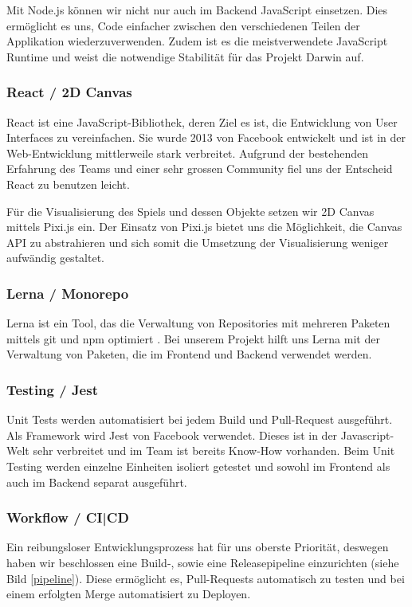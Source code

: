 \documentclass[11pt,a4paper,titlepage]{article}
\begin{document}
Mit Node.js können wir nicht nur auch im Backend JavaScript einsetzen. Dies ermöglicht es uns, Code einfacher zwischen den verschiedenen Teilen der Applikation wiederzuverwenden. Zudem ist es die meistverwendete JavaScript Runtime \cite{node.js} und weist die notwendige Stabilität für das Projekt Darwin auf.

\subsubsection{React / 2D Canvas}
React ist eine JavaScript-Bibliothek, deren Ziel es ist, die Entwicklung von User Interfaces zu vereinfachen. Sie wurde 2013 von Facebook entwickelt und ist in der Web-Entwicklung mittlerweile stark verbreitet.
Aufgrund der bestehenden Erfahrung des Teams und einer sehr grossen Community fiel uns der Entscheid React zu benutzen leicht.

Für die Visualisierung des Spiels und dessen Objekte setzen wir 2D Canvas mittels Pixi.js ein. Der Einsatz von Pixi.js bietet uns die Möglichkeit, die Canvas API zu abstrahieren und sich somit die Umsetzung der Visualisierung weniger aufwändig gestaltet.

\subsubsection{Lerna / Monorepo}
Lerna ist ein Tool, das die Verwaltung von Repositories mit mehreren Paketen mittels git und npm optimiert \cite{lerna}. Bei unserem Projekt hilft uns Lerna mit der Verwaltung von Paketen, die im Frontend und Backend verwendet werden.

\subsubsection{Testing / Jest}
Unit Tests werden automatisiert bei jedem Build und Pull-Request ausgeführt.
Als Framework wird Jest von Facebook verwendet. Dieses ist in der Javascript-Welt sehr verbreitet und im Team ist bereits Know-How vorhanden.
Beim Unit Testing werden einzelne Einheiten isoliert getestet und sowohl im Frontend als auch im Backend separat ausgeführt.

\subsubsection{Workflow / CI|CD}
Ein reibungsloser Entwicklungsprozess hat für uns oberste Priorität, deswegen haben wir beschlossen eine Build-, sowie eine Releasepipeline einzurichten (siehe Bild \ref{pipeline}). Diese ermöglicht es, Pull-Requests automatisch zu testen und bei einem erfolgten Merge automatisiert zu Deployen.
\end{document}
